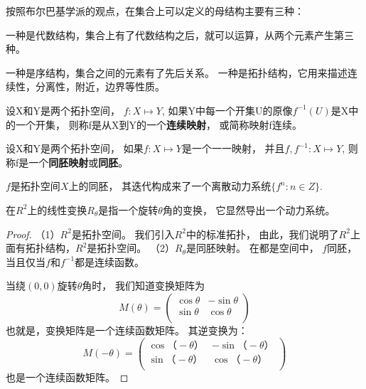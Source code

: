 \begin{defination}[离散动力系统]
按照布尔巴基学派的观点，在集合上可以定义的母结构主要有三种：


一种是代数结构，集合上有了代数结构之后，就可以运算，从两个元素产生第三种。


一种是序结构，集合之间的元素有了先后关系。
一种是拓扑结构，它用来描述连续性，分离性，附近，边界等性质。

\begin{defination}
设X和Y是两个拓扑空间，
\(f:X\mapsto Y\),
如果Y中每一个开集U的原像\(f^{-1}(U)\)是X中的一个开集，
则称f是从X到Y的一个\textbf{连续映射}，
或简称映射f连续。
\end{defination}

\begin{defination}
设X和Y是两个拓扑空间，
如果\(f:X\mapsto Y\)是一个一一映射，
并且\(f,f^{-1}:X\mapsto Y\),
则称f是一个\textbf{同胚映射}或\textbf{同胚}。
\end{defination}

\begin{defination}[离散动力系统]
\(f\)是拓扑空间\(X\)上的同胚，
其迭代构成来了一个离散动力系统\(\{f^n:n\in Z\}\).
\end{defination}


在\(R^2\)上的线性变换\(R_{\theta}\)是指一个旋转\(\theta\)角的变换，
它显然导出一个动力系统。


\begin{proof}
（1）\(R^2\)是拓扑空间。
我们引入\(R^2\)中的标准拓扑，
由此，我们说明了\(R^2\)上面有拓扑结构，\(R^2\)是拓扑空间。
（2）\(R_{\theta}\)是同胚映射。
在都是空间中，
\(f\)同胚，
当且仅当\(f\)和\(f^{-1}\)都是连续函数。

当绕\((0,0)\)旋转\(\theta\)角时，
我们知道变换矩阵为
\[M(\theta)=
\left(
  \begin{array}{cc}
    \cos \theta & -\sin \theta \\
    \sin \theta & \cos \theta \\
  \end{array}
\right)\]
也就是，变换矩阵是一个连续函数矩阵。
其逆变换为：
\[M(-\theta)=
\left(
  \begin{array}{cc}
    \cos （- \theta） & -\sin （-\theta） \\
    \sin （-\theta） & \cos （-\theta） \\
  \end{array}
\right)\]
也是一个连续函数矩阵。


\end{proof}
\end{defination}
